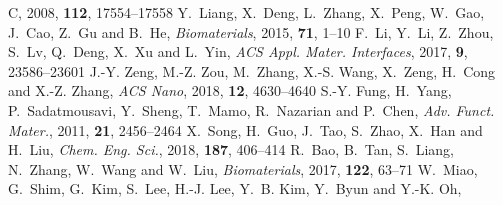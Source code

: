 \documentclass[twoside,twocolumn,9pt]{article}
\begin{document}
\begin{mcitethebibliography}{79}
{  C}, 2008, \textbf{112}, 17554--17558\relax
\mciteBstWouldAddEndPuncttrue
\mciteSetBstMidEndSepPunct{\mcitedefaultmidpunct}
{\mcitedefaultendpunct}{\mcitedefaultseppunct}\relax
\EndOfBibitem
{}
Y.~Liang, X.~Deng, L.~Zhang, X.~Peng, W.~Gao, J.~Cao, Z.~Gu and B.~He,
  \emph{Biomaterials}, 2015, \textbf{71}, 1--10\relax
\mciteBstWouldAddEndPuncttrue
\mciteSetBstMidEndSepPunct{\mcitedefaultmidpunct}
{\mcitedefaultendpunct}{\mcitedefaultseppunct}\relax
\EndOfBibitem
{}
F.~Li, Y.~Li, Z.~Zhou, S.~Lv, Q.~Deng, X.~Xu and L.~Yin, \emph{ACS Appl. Mater.
  Interfaces}, 2017, \textbf{9}, 23586--23601\relax
\mciteBstWouldAddEndPuncttrue
\mciteSetBstMidEndSepPunct{\mcitedefaultmidpunct}
{\mcitedefaultendpunct}{\mcitedefaultseppunct}\relax
\EndOfBibitem
{}
J.-Y. Zeng, M.-Z. Zou, M.~Zhang, X.-S. Wang, X.~Zeng, H.~Cong and X.-Z. Zhang,
  \emph{ACS Nano}, 2018, \textbf{12}, 4630--4640\relax
\mciteBstWouldAddEndPuncttrue
\mciteSetBstMidEndSepPunct{\mcitedefaultmidpunct}
{\mcitedefaultendpunct}{\mcitedefaultseppunct}\relax
\EndOfBibitem
{}
S.-Y. Fung, H.~Yang, P.~Sadatmousavi, Y.~Sheng, T.~Mamo, R.~Nazarian and
  P.~Chen, \emph{Adv. Funct. Mater.}, 2011, \textbf{21}, 2456--2464\relax
\mciteBstWouldAddEndPuncttrue
\mciteSetBstMidEndSepPunct{\mcitedefaultmidpunct}
{\mcitedefaultendpunct}{\mcitedefaultseppunct}\relax
\EndOfBibitem
{}
X.~Song, H.~Guo, J.~Tao, S.~Zhao, X.~Han and H.~Liu, \emph{Chem. Eng. Sci.},
  2018, \textbf{187}, 406--414\relax
\mciteBstWouldAddEndPuncttrue
\mciteSetBstMidEndSepPunct{\mcitedefaultmidpunct}
{\mcitedefaultendpunct}{\mcitedefaultseppunct}\relax
\EndOfBibitem
{}
R.~Bao, B.~Tan, S.~Liang, N.~Zhang, W.~Wang and W.~Liu, \emph{Biomaterials},
  2017, \textbf{122}, 63--71\relax
\mciteBstWouldAddEndPuncttrue
\mciteSetBstMidEndSepPunct{\mcitedefaultmidpunct}
{\mcitedefaultendpunct}{\mcitedefaultseppunct}\relax
\EndOfBibitem
{}
W.~Miao, G.~Shim, G.~Kim, S.~Lee, H.-J. Lee, Y.~B. Kim, Y.~Byun and Y.-K. Oh,

\end{mcitethebibliography}
\end{document}
